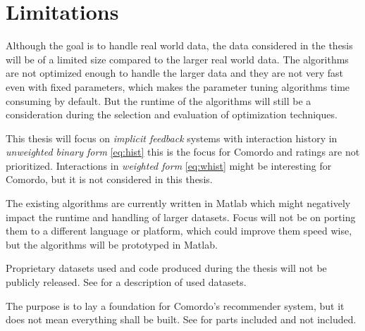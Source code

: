 
\section{Limitations}\label{sec:intro:limitations}


Although the goal is to handle real world data, the data considered in the thesis will be of a limited size compared to the larger real world data. The algorithms are not optimized enough to handle the larger data and they are not very fast even with fixed parameters, which makes the parameter tuning algorithms time consuming by default. But the runtime of the algorithms will still be a consideration during the selection and evaluation of optimization techniques.

This thesis will focus on \textit{implicit feedback} systems with interaction history in \textit{unweighted binary form} \eqref{eq:hist} this is the focus for Comordo and ratings are not prioritized. Interactions in \textit{weighted form} \eqref{eq:whist} might be interesting for Comordo, but it is not considered in this thesis.

The existing algorithms are currently written in Matlab which might negatively impact the runtime and handling of larger datasets. Focus will not be on porting them to a different language or platform, which could improve them speed wise, but the algorithms will be prototyped in Matlab.

Proprietary datasets used and code produced during the thesis will not be publicly released. See  for a description of used datasets.

The purpose is to lay a foundation for Comordo's recommender system, but it does not mean everything shall be built. See  for parts included and not included.

